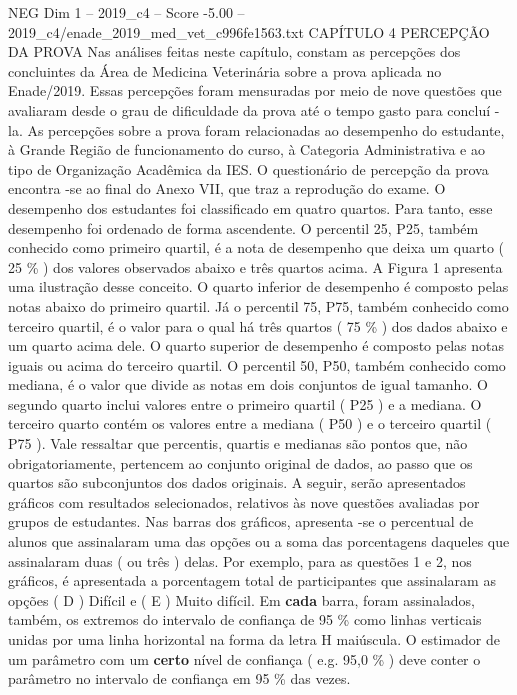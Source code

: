 \begin{textsample}{NEG Dim 1 – 2019\_c4 – Score -5.00 – 2019\_c4/enade\_2019\_med\_vet\_c996fe1563.txt}  \label{ex:f1_neg_089}
CAPÍTULO 4 PERCEPÇÃO DA PROVA Nas análises feitas neste capítulo, constam as percepções dos concluintes da Área de Medicina Veterinária sobre a prova aplicada no Enade/2019.
Essas percepções foram mensuradas por meio de nove questões que avaliaram desde o grau de dificuldade da prova até o tempo gasto para concluí -la.
As percepções sobre a prova foram relacionadas ao desempenho do estudante, à Grande Região de funcionamento do curso, à Categoria Administrativa e ao tipo de Organização Acadêmica da IES.
O questionário de percepção da prova encontra -se ao final do Anexo VII, que traz a reprodução do exame.
O desempenho dos estudantes foi classificado em quatro quartos.
Para tanto, esse desempenho foi ordenado de forma ascendente.
O percentil 25, P25, também conhecido como primeiro quartil, é a nota de desempenho que deixa um quarto ( 25 \% ) dos valores observados abaixo e três quartos acima.
A Figura 1 apresenta uma ilustração desse conceito.
O quarto inferior de desempenho é composto pelas notas abaixo do primeiro quartil.
Já o percentil 75, P75, também conhecido como terceiro quartil, é o valor para o qual há três quartos ( 75 \% ) dos dados abaixo e um quarto acima dele.
O quarto superior de desempenho é composto pelas notas iguais ou acima do terceiro quartil.
O percentil 50, P50, também conhecido como mediana, é o valor que divide as notas em dois conjuntos de igual tamanho.
O segundo quarto inclui valores entre o primeiro quartil ( P25 ) e a mediana.
O terceiro quarto contém os valores entre a mediana ( P50 ) e o terceiro quartil ( P75 ).
Vale ressaltar que percentis, quartis e medianas são pontos que, não obrigatoriamente, pertencem ao conjunto original de dados, ao passo que os quartos são subconjuntos dos dados originais.
A seguir, serão apresentados gráficos com resultados selecionados, relativos às nove questões avaliadas por grupos de estudantes.
Nas barras dos gráficos, apresenta -se o percentual de alunos que assinalaram uma das opções ou a soma das porcentagens daqueles que assinalaram duas ( ou três ) delas.
Por exemplo, para as questões 1 e 2, nos gráficos, é apresentada a porcentagem total de participantes que assinalaram as opções ( D ) Difícil e ( E ) Muito difícil.
Em \textbf{cada} barra, foram assinalados, também, os extremos do intervalo de confiança de 95 \% como linhas verticais unidas por uma linha horizontal na forma da letra H maiúscula.
O estimador de um parâmetro com um \textbf{certo} nível de confiança ( e.g. 95,0 \% ) deve conter o parâmetro no intervalo de confiança em 95 \% das vezes.

\end{textsample}
